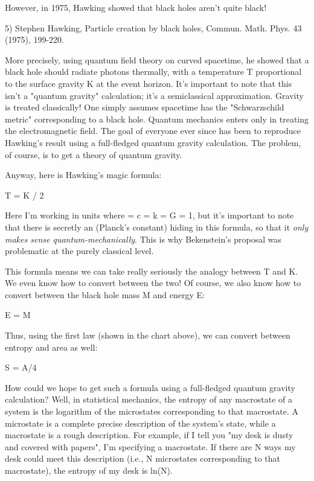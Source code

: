 However, in 1975, Hawking showed that black holes aren't quite black!

5) Stephen Hawking, Particle creation by black holes, Commun. 
Math. Phys. 43 (1975), 199-220.

More precisely, using quantum field theory on curved spacetime, he
showed that a black hole should radiate photons thermally, with a
temperature T proportional to the surface gravity K at the event
horizon.  It's important to note that this isn't a "quantum gravity"
calculation; it's a semiclassical approximation.  Gravity is treated
classically!  One simply assumes spacetime has the "Schwarzschild
metric" corresponding to a black hole.  Quantum mechanics enters only in
treating the electromagnetic field.  The goal of everyone ever since has
been to reproduce Hawking's result using a full-fledged quantum gravity
calculation.  The problem, of course, is to get a theory of quantum
gravity.

Anyway, here is Hawking's magic formula:

                        T = K / 2 \pi 

Here I'm working in units where \hbar  = c = k = G = 1, but it's important
to note that there is secretly an \hbar  (Planck's constant) hiding in
this formula, so that it \emph{only makes sense quantum-mechanically}.  This
is why Bekenstein's proposal was problematic at the purely classical
level.  

This formula means we can take really seriously the analogy between T
and K.  We even know how to convert between the two!  Of course, we also
know how to convert between the black hole mass M and energy E:

                           E = M 

Thus, using the first law (shown in the chart above), we can convert
between entropy and area as well:

                          S = A/4

How could we hope to get such a formula using a full-fledged quantum
gravity calculation?  Well, in statistical mechanics, the entropy of any
macrostate of a system is the logarithm of the microstates corresponding
to that macrostate.  A microstate is a complete precise description of
the system's state, while a macrostate is a rough description.  For
example, if I tell you "my desk is dusty and covered with papers", I'm
specifying a macrostate.  If there are N ways my desk could meet this
description (i.e., N microstates corresponding to that macrostate), the
entropy of my desk is ln(N).

